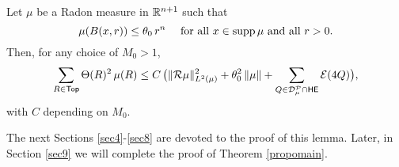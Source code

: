 \begin{mlemma}\label{mainlemma}
	Let $\mu$ be a Radon measure in ${\mathbb R}^{n+1}$ such that
	$$
	\mu(B(x,r))\leq \theta_0\,r^n\quad \mbox{ for all $x\in\operatorname{supp}\mu$ and all $r>0$}.
	$$
	Then, for any choice of $M_0>1$,
	\begin{equation}\label{eqmainlemma*}
		\sum_{R\in{\mathsf {Top}}} \Theta(R)^2\,\mu(R)\leq C\,\big(\|{\mathcal R}\mu\|_{L^2(\mu)}^2 + \theta_0^2\,\|\mu\|
		+ \sum_{Q\in{\mathcal D}_\mu^{\mathcal P}\cap{\mathsf {HE}}}{\mathcal E}(4Q)\big),
	\end{equation}
	with $C$ depending on $M_0$.
\end{mlemma}

The next Sections \ref{sec4}-\ref{sec8} are devoted to the proof of this lemma. Later, in Section \ref{sec9} we will complete the 
proof of Theorem \ref{propomain}.

\vv
